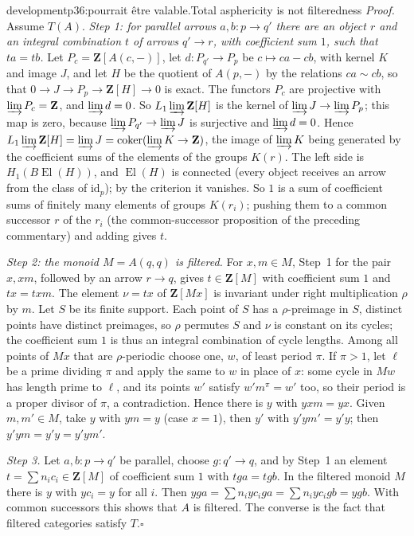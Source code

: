 \begin{dcomment}{development}{p36:pourrait être valable.}{Total asphericity is not filteredness}
\textit{Proof.}
Assume $T(A)$. \emph{Step 1: for parallel arrows $a,b:p\to q'$ there are an object $r$ and an integral combination $t$ of arrows $q'\to r$, with coefficient sum $1$, such that $ta=tb$.} Let $P_c=\mathbf Z[A(c,-)]$, let $d:P_{q'}\to P_p$ be $c\mapsto ca-cb$, with kernel $K$ and image $J$, and let $H$ be the quotient of $A(p,-)$ by the relations $ca\sim cb$, so that $0\to J\to P_p\to\mathbf Z[H]\to0$ is exact. The functors $P_c$ are projective with $\varinjlim P_c=\mathbf Z$, and $\varinjlim d=0$. So $L_1\varinjlim\mathbf Z[H]$ is the kernel of $\varinjlim J\to\varinjlim P_p$; this map is zero, because $\varinjlim P_{q'}\to\varinjlim J$ is surjective and $\varinjlim d=0$. Hence $L_1\varinjlim\mathbf Z[H]=\varinjlim J=\operatorname{coker}(\varinjlim K\to\mathbf Z)$, the image of $\varinjlim K$ being generated by the coefficient sums of the elements of the groups $K(r)$. The left side is $H_1(B\operatorname{El}(H))$, and $\operatorname{El}(H)$ is connected (every object receives an arrow from the class of $\mathrm{id}_p$); by the criterion it vanishes. So $1$ is a sum of coefficient sums of finitely many elements of groups $K(r_i)$; pushing them to a common successor $r$ of the $r_i$ (the common-successor proposition of the preceding commentary) and adding gives $t$.

\emph{Step 2: the monoid $M=A(q,q)$ is filtered.} For $x,m\in M$, Step~1 for the pair $x,xm$, followed by an arrow $r\to q$, gives $t\in\mathbf Z[M]$ with coefficient sum $1$ and $tx=txm$. The element $\nu=tx$ of $\mathbf Z[Mx]$ is invariant under right multiplication $\rho$ by $m$. Let $S$ be its finite support. Each point of $S$ has a $\rho$-preimage in $S$, distinct points have distinct preimages, so $\rho$ permutes $S$ and $\nu$ is constant on its cycles; the coefficient sum $1$ is thus an integral combination of cycle lengths. Among all points of $Mx$ that are $\rho$-periodic choose one, $w$, of least period $\pi$. If $\pi>1$, let $\ell$ be a prime dividing $\pi$ and apply the same to $w$ in place of $x$: some cycle in $Mw$ has length prime to $\ell$, and its points $w'$ satisfy $w'm^\pi=w'$ too, so their period is a proper divisor of $\pi$, a contradiction. Hence there is $y$ with $yxm=yx$. Given $m,m'\in M$, take $y$ with $ym=y$ (case $x=1$), then $y'$ with $y'ym'=y'y$; then $y'ym=y'y=y'ym'$.

\emph{Step 3.} Let $a,b:p\to q'$ be parallel, choose $g:q'\to q$, and by Step~1 an element $t=\sum n_ic_i\in\mathbf Z[M]$ of coefficient sum $1$ with $tga=tgb$. In the filtered monoid $M$ there is $y$ with $yc_i=y$ for all $i$. Then $yga=\sum n_iyc_iga=\sum n_iyc_igb=ygb$. With common successors this shows that $A$ is filtered. The converse is the fact that filtered categories satisfy $T$.\hfill$\square$


\end{dcomment}
